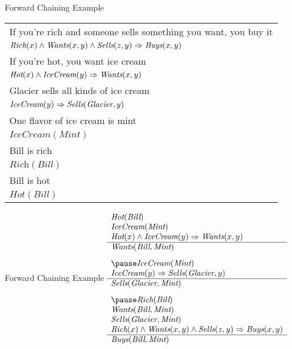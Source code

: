 \documentclass[14pt]{beamer}
\begin{document}
\begin{frame}{Forward Chaining Example}
	\begin{tabular}{p{4in}}
		If you're rich and someone sells something you want, you buy it \\
		\tab$\textit{Rich}(x) \land \textit{Wants}(x, y) \land \textit{Sells}(z, y) \Rightarrow \textit{Buys}(x, y)$ \\
		If you're hot, you want ice cream \\
		\tab$\textit{Hot}(x) \land \textit{IceCream}(y) \Rightarrow \textit{Wants}(x, y)$ \\
		Glacier sells all kinds of ice cream \\
		\tab$\textit{IceCream}(y) \Rightarrow \textit{Sells}(\textit{Glacier}, y)$ \\
		One flavor of ice cream is mint \\
		\tab$\textit{IceCream}(\textit{Mint})$ \\
		Bill is rich \\
		\tab$\textit{Rich}(\textit{Bill})$ \\
		Bill is hot \\
		\tab$\textit{Hot}(\textit{Bill})$
	\end{tabular}
\end{frame}
\begin{frame}{Forward Chaining Example}
	$
	\begin{array}{l}
		\textit{Hot}(\textit{Bill}) \\
		\textit{IceCream}(\textit{Mint}) \\
		\textit{Hot}(x) \land \textit{IceCream}(y) \limpl \textit{Wants}(x, y) \\
		\hline
		\textit{Wants}(\textit{Bill}, \textit{Mint}) \\[.8em]
		\pause
		\textit{IceCream}(\textit{Mint}) \\
		\textit{IceCream}(y) \limpl \textit{Sells}(\textit{Glacier}, y) \\
		\hline
		\textit{Sells}(\textit{Glacier}, \textit{Mint}) \\[.8em]
		\pause
		\textit{Rich}(\textit{Bill}) \\
		\textit{Wants}(\textit{Bill}, \textit{Mint}) \\
		\textit{Sells}(\textit{Glacier}, \textit{Mint}) \\
		\textit{Rich}(x) \land \textit{Wants}(x, y) \land \textit{Sells}(z, y) \limpl \textit{Buys}(x, y) \\
		\hline
		\textit{Buys}(\textit{Bill}, \textit{Mint})
	\end{array}
	$
\end{frame}
\end{document}
